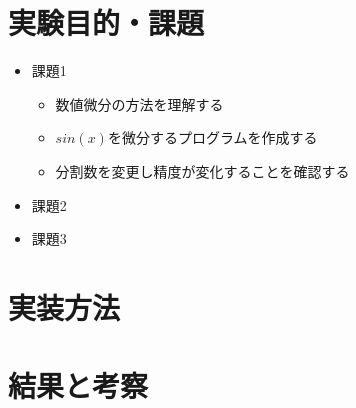 \documentclass[dvipdfmx]{jsarticle}
\begin{document}
\section{実験目的・課題}

\begin{itemize}
  \item 課題1
  \begin{itemize}
    \item 数値微分の方法を理解する
    \item $sin(x)$を微分するプログラムを作成する
    \item 分割数を変更し精度が変化することを確認する
  \end{itemize}
  \item 課題2
  \item 課題3
\end{itemize}

\section{実装方法}

\section{結果と考察}

\begin{thebibliography}{10}
  
  \url{}
\end{thebibliography}
\end{document}
